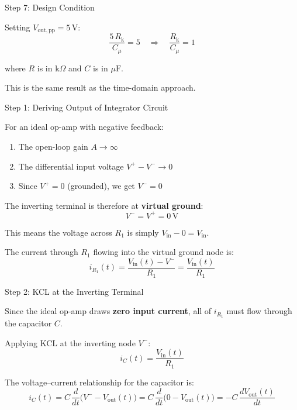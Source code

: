 \documentclass{beamer}
\numberwithin{equation}{section}
\theoremstyle{remark}
\begin{document}
\begin{frame}{Step 7: Design Condition}
 
Setting $V_{\mathrm{out,pp}} = 5\,\mathrm{V}$:
\[
  \frac{5\,R_{\mathrm{k}}}{C_\mu} = 5
  \quad\Longrightarrow\quad
  \frac{R_{\mathrm{k}}}{C_\mu} = 1
  \]
 
where $R$ is in $\mathrm{k}\Omega$ and $C$ is in $\mu\mathrm{F}$.
 
This is the same result as the time-domain approach. 
\end{frame}
 



\begin{frame}{Step 1: Deriving Output of Integrator Circuit}
 
For an ideal op-amp with negative feedback:
 
\begin{enumerate}
  \item The open-loop gain $A \to \infty$
  \item The differential input voltage $V^+ - V^- \to 0$
  \item Since $V^+ = 0$ (grounded), we get $V^- = 0$
\end{enumerate}
 
The inverting terminal is therefore at \textbf{virtual ground}:
\[
  V^- = V^+ = 0\,\mathrm{V}
\]
 
This means the voltage across $R_1$ is simply $V_{\mathrm{in}} - 0 = V_{\mathrm{in}}$.
 
The current through $R_1$ flowing into the virtual ground node is:
\[
  i_{R_1}(t) = \frac{V_{\mathrm{in}}(t) - V^-}{R_1} = \frac{V_{\mathrm{in}}(t)}{R_1}
\]
 
\end{frame}
 
\begin{frame}{Step 2: KCL at the Inverting Terminal}
 
Since the ideal op-amp draws \textbf{zero input current}, all of
$i_{R_1}$ must flow through the capacitor $C$.
 
Applying KCL at the inverting node $V^-$:
\[
  i_C(t) = \frac{V_{\mathrm{in}}(t)}{R_1}
\]
 
The voltage--current relationship for the capacitor is:
\[
  i_C(t) = C\,\frac{d}{dt}\bigl(V^- - V_{\mathrm{out}}(t)\bigr)
           = C\,\frac{d}{dt}\bigl(0 - V_{\mathrm{out}}(t)\bigr)
           = -C\,\frac{dV_{\mathrm{out}}(t)}{dt}
\]
 
\end{frame}
 
\end{document}
